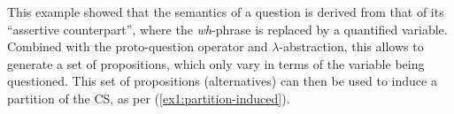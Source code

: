 This example showed that the semantics of a question is derived from that of its ``assertive counterpart'', where the \textit{wh}-phrase is replaced by a quantified variable. Combined with the proto-question operator and $\lambda$-abstraction, this allows to generate a set of propositions, which only vary in terms of the variable being questioned. This set of propositions (alternatives) can then be used to induce a partition of the CS, as per (\ref{ex1:partition-induced}).


%















